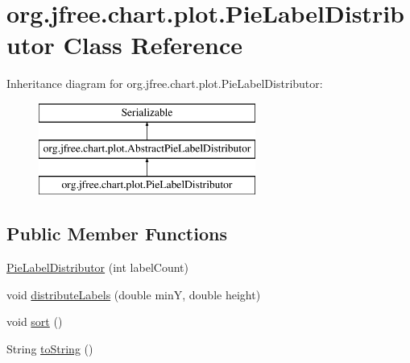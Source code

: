 \hypertarget{classorg_1_1jfree_1_1chart_1_1plot_1_1_pie_label_distributor}{}\section{org.\+jfree.\+chart.\+plot.\+Pie\+Label\+Distributor Class Reference}
\label{classorg_1_1jfree_1_1chart_1_1plot_1_1_pie_label_distributor}
Inheritance diagram for org.\+jfree.\+chart.\+plot.\+Pie\+Label\+Distributor\+:\begin{figure}[H]
\begin{center}
\leavevmode
\includegraphics[height=3.000000cm]{classorg_1_1jfree_1_1chart_1_1plot_1_1_pie_label_distributor}
\end{center}
\end{figure}
\subsection*{Public Member Functions}
\begin{DoxyCompactItemize}
\item 
\mbox{\hyperlink{classorg_1_1jfree_1_1chart_1_1plot_1_1_pie_label_distributor_add33e8ee5fd3c290272b3e9eb1569c73}{Pie\+Label\+Distributor}} (int label\+Count)
\item 
void \mbox{\hyperlink{classorg_1_1jfree_1_1chart_1_1plot_1_1_pie_label_distributor_a4a742856275ba097e9c2560fc98ee749}{distribute\+Labels}} (double minY, double height)
\item 
void \mbox{\hyperlink{classorg_1_1jfree_1_1chart_1_1plot_1_1_pie_label_distributor_a99d5e162024c77d89be826b1c4f27f58}{sort}} ()
\item 
String \mbox{\hyperlink{classorg_1_1jfree_1_1chart_1_1plot_1_1_pie_label_distributor_a72726fbc62dfdb2bf6d80c6ea78311b9}{to\+String}} ()
\end{DoxyCompactItemize}
